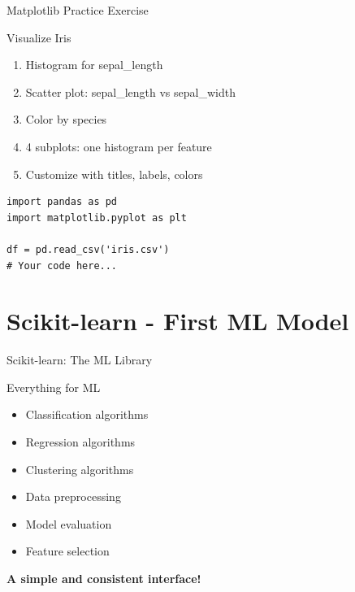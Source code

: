 \documentclass[aspectratio=169]{beamer}
\begin{document}
\begin{frame}[fragile]{Matplotlib Practice Exercise}
\begin{block}{Visualize Iris}
\begin{enumerate}
    \item Histogram for sepal\_length
    \item Scatter plot: sepal\_length vs sepal\_width
    \item Color by species
    \item 4 subplots: one histogram per feature
    \item Customize with titles, labels, colors
\end{enumerate}
\end{block}

\begin{lstlisting}
import pandas as pd
import matplotlib.pyplot as plt

df = pd.read_csv('iris.csv')
# Your code here...
\end{lstlisting}
\end{frame}

\section{Scikit-learn - First ML Model}

\begin{frame}{Scikit-learn: The ML Library}
\begin{block}{Everything for ML}
\begin{itemize}
    \item Classification algorithms
    \item Regression algorithms
    \item Clustering algorithms
    \item Data preprocessing
    \item Model evaluation
    \item Feature selection
\end{itemize}
\end{block}

\vspace{0.5cm}
\begin{center}
\textbf{A simple and consistent interface!}
\end{center}
\end{frame}
\end{document}
